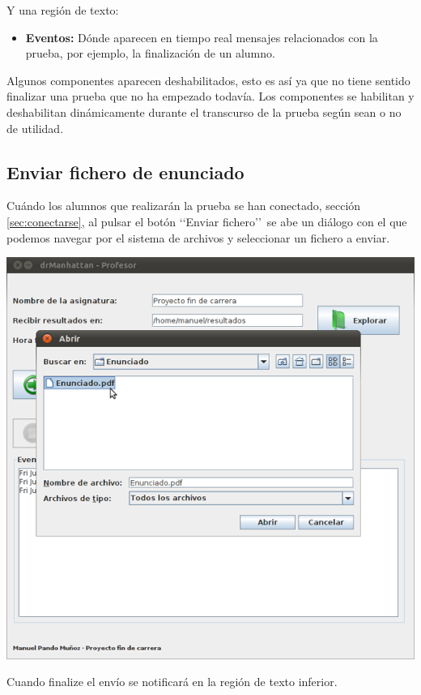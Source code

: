 \documentclass[11pt]{article}
\begin{document}
Y una región de texto:

\begin{itemize}
    \item {\bfseries Eventos:} Dónde aparecen en tiempo real mensajes relacionados con la prueba, por ejemplo, la finalización de un alumno.
\end{itemize}

Algunos componentes aparecen deshabilitados, esto es así ya que no tiene sentido finalizar una prueba que no ha empezado todavía. Los componentes se habilitan y deshabilitan dinámicamente durante el transcurso de la prueba según sean o no de utilidad.


\subsection{Enviar fichero de enunciado}

Cuándo los alumnos que realizarán la prueba se han conectado, sección \ref{sec:conectarse}, al pulsar el botón \lq\lq Enviar fichero\rq\rq \ se abe un diálogo con el que podemos navegar por el sistema de archivos y seleccionar un fichero a enviar.

\begin{center}
    \includegraphics[width=.90\linewidth]{imagenes/enviar}
\end{center}

Cuando finalize el envío se notificará en la región de texto inferior.
\end{document}
